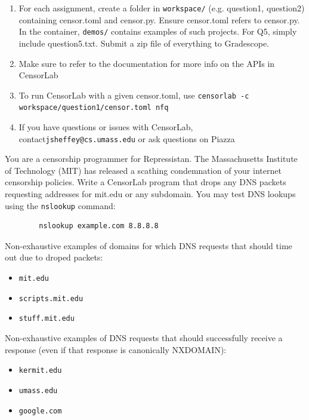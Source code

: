 \documentclass[12pt]{article}
\newenvironment{question}[2][Question]{\begin{trivlist}
\item[\hskip \labelsep {\bfseries #1}\hskip \labelsep {\bfseries #2.}]}{\end{trivlist}}
\begin{document}
\begin{enumerate}
    \item For each assignment, create a folder in \texttt{workspace/} (e.g. question1, question2) containing censor.toml and censor.py. Ensure censor.toml refers to censor.py. In the container, \texttt{demos/} contains examples of such projects. For Q5, simply include question5.txt. Submit a zip file of everything to Gradescope.
    \item Make sure to refer to the documentation for more info on the APIs in CensorLab
    \item To run CensorLab with a given censor.toml, use \texttt{censorlab -c workspace/question1/censor.toml nfq}
    \item If you have questions or issues with CensorLab, contact\texttt{jsheffey@cs.umass.edu} or ask questions on Piazza
\end{enumerate}
\newpage
% 
\begin{question}{1 [20pt]}
    You are a censorship programmer for Repressistan. The Massachusetts Institute of Technology (MIT) has released a scathing condemnation of your internet censorship policies.  Write a CensorLab program that drops any DNS packets requesting addresses for mit.edu or any subdomain.
    You may test DNS lookups using the \texttt{nslookup} command:
    \begin{verbatim}
        nslookup example.com 8.8.8.8
    \end{verbatim}

    \noindent Non-exhaustive examples of domains for which DNS requests that should time out due to droped packets:
    \begin{itemize}
        \item \texttt{mit.edu}
        \item \texttt{scripts.mit.edu}
        \item \texttt{stuff.mit.edu}
    \end{itemize}
    \noindent Non-exhaustive examples of DNS requests that should successfully receive a response (even if that response is canonically NXDOMAIN):
    \begin{itemize}
        \item \texttt{kermit.edu}
        \item \texttt{umass.edu}
        \item \texttt{google.com}
    \end{itemize}
\end{question}
\end{document}
